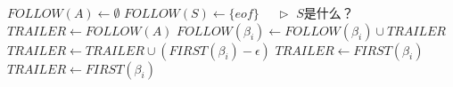 \documentclass[varwidth=\maxdimen]{standalone}
\newcommand{\LeftComment}[1]{$\quad\triangleright$ #1}
\begin{document}
\begin{algorithmic}[1] %
    \State $FOLLOW(A) \gets \emptyset$
  \EndFor
  \State $FOLLOW(S) \gets \{eof\}$  \LeftComment{$S$是什么？}
      \State $TRAILER \gets FOLLOW(A)$
          \State $FOLLOW(\beta_i) \gets FOLLOW(\beta_i)\cup TRAILER$
            \State $TRAILER \gets TRAILER\cup(FIRST(\beta_i)-\epsilon)$
          \Else
            \State $TRAILER \gets FIRST(\beta_i)$
          \EndIf
        \Else
          \State $TRAILER \gets FIRST(\beta_i)$
        \EndIf
      \EndFor
    \EndFor
  \EndWhile
\end{algorithmic}
\end{document}
